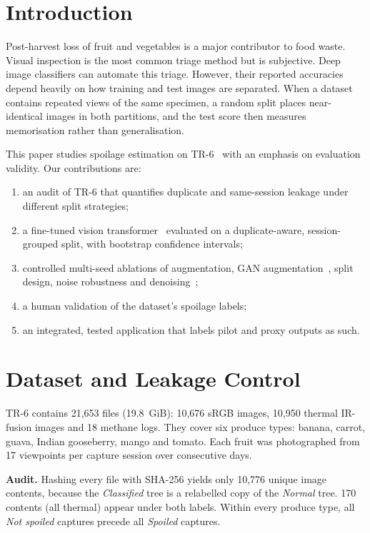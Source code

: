 \documentclass[conference]{IEEEtran}
\begin{document}
\section{Introduction}
Post-harvest loss of fruit and vegetables is a major contributor to food waste. Visual inspection is the most common triage method but is subjective.
Deep image classifiers can automate this triage. However, their reported accuracies depend heavily on how training and test images are separated.
When a dataset contains repeated views of the same specimen, a random split places near-identical images in both partitions, and the test score then measures memorisation rather than generalisation.

This paper studies spoilage estimation on TR-6~\cite{tr6} with an emphasis on evaluation validity. Our contributions are:
\begin{enumerate}
\item an audit of TR-6 that quantifies duplicate and same-session leakage under different split strategies;
\item a fine-tuned vision transformer~\cite{vit} evaluated on a duplicate-aware, session-grouped split, with bootstrap confidence intervals;
\item controlled multi-seed ablations of augmentation, GAN augmentation~\cite{dcgan,cgan}, split design, noise robustness and denoising~\cite{dncnn};
\item a human validation of the dataset's spoilage labels;
\item an integrated, tested application that labels pilot and proxy outputs as such.
\end{enumerate}

\section{Dataset and Leakage Control}
TR-6 contains 21,653 files (19.8~GiB): 10,676 sRGB images, 10,950 thermal IR-fusion images and 18 methane logs. They cover six produce types: banana, carrot, guava, Indian gooseberry, mango and tomato. Each fruit was photographed from 17 viewpoints per capture session over consecutive days.

\textbf{Audit.} Hashing every file with SHA-256 yields only 10,776 unique image contents, because the \emph{Classified} tree is a relabelled copy of the \emph{Normal} tree. 170 contents (all thermal) appear under both labels. Within every produce type, all \emph{Not spoiled} captures precede all \emph{Spoiled} captures.
\end{document}
